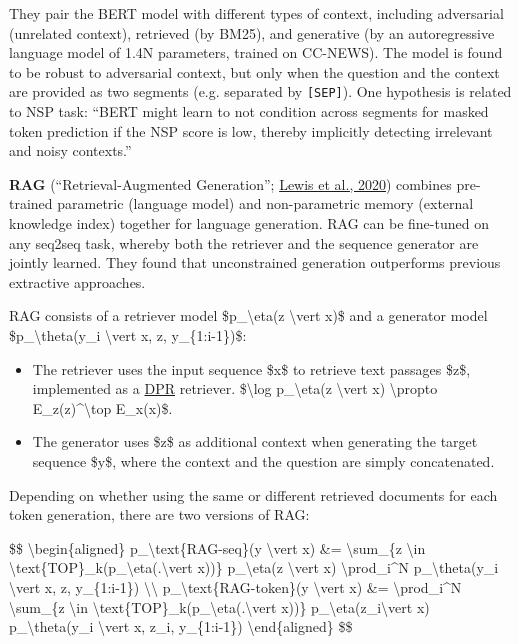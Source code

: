 They pair the BERT model with different types of context, including adversarial (unrelated context), retrieved (by BM25), and generative (by an autoregressive language model of 1.4N parameters, trained on CC-NEWS). The model is found to be robust to adversarial context, but only when the question and the context are provided as two segments (e.g. separated by \texttt{{[}SEP{]}}). One hypothesis is related to NSP task: ``BERT might learn to not condition across segments for masked token prediction if the NSP score is low, thereby implicitly detecting irrelevant and noisy contexts.''

\label{RAG}{}\textbf{RAG} (``Retrieval-Augmented Generation''; \href{https://arxiv.org/abs/2005.11401}{Lewis et al., 2020}) combines pre-trained parametric (language model) and non-parametric memory (external knowledge index) together for language generation. RAG can be fine-tuned on any seq2seq task, whereby both the retriever and the sequence generator are jointly learned. They found that unconstrained generation outperforms previous extractive approaches.

RAG consists of a retriever model \$p\_\textbackslash eta(z \textbackslash vert x)\$ and a generator model \$p\_\textbackslash theta(y\_i \textbackslash vert x, z, y\_\{1:i-1\})\$:

\begin{itemize}
\tightlist
\item
  The retriever uses the input sequence \$x\$ to retrieve text passages \$z\$, implemented as a \hyperref[DPR]{DPR} retriever. \$\textbackslash log p\_\textbackslash eta(z \textbackslash vert x) \textbackslash propto E\_z(z)\^{}\textbackslash top E\_x(x)\$.
\item
  The generator uses \$z\$ as additional context when generating the target sequence \$y\$, where the context and the question are simply concatenated.
\end{itemize}

Depending on whether using the same or different retrieved documents for each token generation, there are two versions of RAG:

\$\$ \textbackslash begin\{aligned\} p\_\textbackslash text\{RAG-seq\}(y \textbackslash vert x) \&= \textbackslash sum\_\{z \textbackslash in \textbackslash text\{TOP\}\_k(p\_\textbackslash eta(.\textbackslash vert x))\} p\_\textbackslash eta(z \textbackslash vert x) \textbackslash prod\_i\^{}N p\_\textbackslash theta(y\_i \textbackslash vert x, z, y\_\{1:i-1\}) \textbackslash\textbackslash{} p\_\textbackslash text\{RAG-token\}(y \textbackslash vert x) \&= \textbackslash prod\_i\^{}N \textbackslash sum\_\{z \textbackslash in \textbackslash text\{TOP\}\_k(p\_\textbackslash eta(.\textbackslash vert x))\} p\_\textbackslash eta(z\_i\textbackslash vert x) p\_\textbackslash theta(y\_i \textbackslash vert x, z\_i, y\_\{1:i-1\}) \textbackslash end\{aligned\} \$\$


